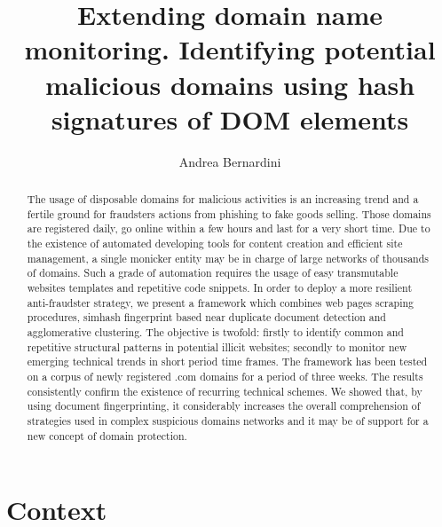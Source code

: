 \documentclass{easychair}
\title{Extending domain name monitoring. 
Identifying potential malicious domains using hash signatures of DOM elements
}
\author{
Andrea Bernardini\inst{1}
}
\institute{
  Fondazione Ugo Bordoni, Rome, Italy\\
  \email{abernardini@fub.it}
}
\begin{document}
\maketitle

\begin{abstract}
  The usage of disposable domains for malicious activities is an increasing trend and a fertile ground for fraudsters actions from phishing to fake goods selling. Those domains are registered daily, go online within a few hours and last for a very short time. Due to the existence of automated developing tools for content creation and efficient site management, a single monicker entity may be in charge of large networks of thousands of domains. Such a grade of automation requires the usage of easy transmutable websites templates and repetitive code snippets. In order to deploy a more resilient anti-fraudster strategy, we present a framework which combines web pages scraping procedures, simhash fingerprint based near duplicate document detection and agglomerative clustering. 
The objective is twofold: firstly to identify common and repetitive structural patterns in potential illicit websites; secondly to monitor new emerging technical trends in short period time frames. The framework has been tested on a corpus of newly registered .com domains for a period of three weeks. The results consistently confirm the existence of recurring technical schemes. We showed that, by using document fingerprinting, it considerably increases the overall comprehension of strategies used in complex suspicious domains networks and it may be of support for a new concept of domain protection.

\end{abstract}


\setcounter{tocdepth}{2}
{\small
\tableofcontents}

%
%

\section{Context}
\label{sect:Context}
\end{document}
